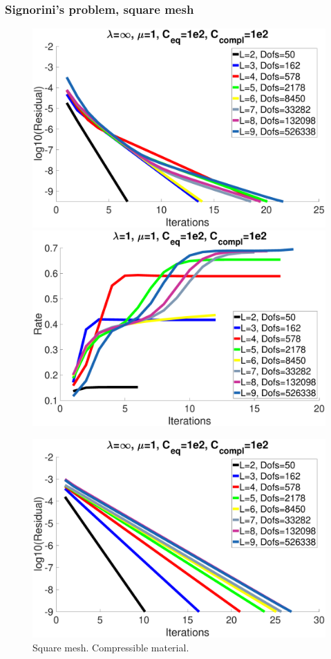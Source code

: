 \documentclass[8pt, oneside]{beamer}   	%
\newcommand{\titlecolor}[1]{\frametitle{\textcolor{dkgrey}{ \textbf{#1}}}}
\begin{document}
\begin{frame}
\titlecolor{Signorini's problem, square mesh}
\footnotesize
\begin{figure}[htbp!]
	\includegraphics[scale=0.08]{img/SquareResidualCompressible.eps}
	\quad
		\includegraphics[scale=0.08]{img/SquareRateCompressible.eps}
	\caption{Square mesh. Compressible material.}
	\label{ResidualRateSquare}
	\includegraphics[scale=0.08]{img/SquareResidualIncompressible.eps}

\end{figure}
\end{frame}
\end{document}

